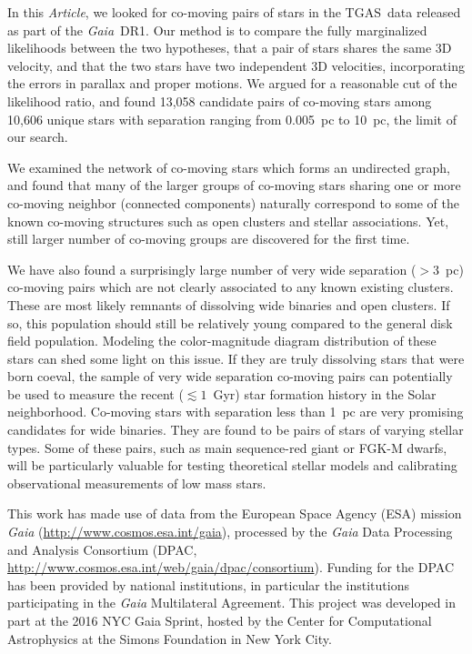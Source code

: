 \documentclass[manuscript, letterpaper]{aastex6}
\newcommand{\project}[1]{\textsl{#1}}
\newcommand{\acronym}[1]{{\small{#1}}}
\newcommand{\gaia}{\project{Gaia}}
\newcommand{\documentname}{\textsl{Article}}
\newcommand{\tgas}{\acronym{TGAS}}
\begin{document}
In this \documentname, we looked for co-moving pairs of stars in the
\tgas\ data released as part of the \gaia\ DR1.
Our method is to compare
the fully marginalized likelihoods between the two hypotheses, that a pair of
stars shares the same 3D velocity, and that the two stars have two independent
3D velocities, incorporating the errors in parallax and proper motions.
We argued for a reasonable cut of the likelihood ratio, and found
13,058 candidate pairs of co-moving stars among 10,606 unique stars
with separation ranging from 0.005~pc to 10~pc, the limit of our search.

We examined the network of co-moving stars which forms an undirected graph,
and found that many of the larger groups of 
co-moving stars sharing one or more co-moving neighbor (connected components)
naturally correspond to some of the known co-moving structures
such as open clusters and stellar associations.
Yet, still larger number of co-moving groups are discovered for the first time.

We have also found a surprisingly large number of very wide separation ($>3$~pc)
co-moving pairs which are not clearly associated to any known existing clusters.
These are most likely remnants of dissolving wide binaries and
open clusters. If so, this population should still be relatively young compared
to the general disk field population. Modeling the color-magnitude diagram
distribution of these stars can shed some light on this issue.
If they are truly dissolving stars that were born coeval,
the sample of very wide separation co-moving pairs can potentially be used
to measure the recent ($\lesssim 1$~Gyr)
star formation history in the Solar neighborhood.
Co-moving stars with separation less than 1~pc are very promising candidates
for wide binaries. They are found to be pairs of stars of varying stellar types.
Some of these pairs, such as main sequence-red giant or FGK-M dwarfs,
will be particularly valuable for testing theoretical
stellar models and calibrating observational measurements of low mass stars.


\acknowledgements

This work has made use of data from the European Space Agency (ESA)
mission {\it Gaia} (\url{http://www.cosmos.esa.int/gaia}), processed by
the {\it Gaia} Data Processing and Analysis Consortium (DPAC,
\url{http://www.cosmos.esa.int/web/gaia/dpac/consortium}). Funding
for the DPAC has been provided by national institutions, in particular
the institutions participating in the {\it Gaia} Multilateral Agreement.
This project was developed in part at the 2016 NYC Gaia Sprint,
hosted by the Center for Computational Astrophysics at the Simons Foundation in New York City.
\end{document}
